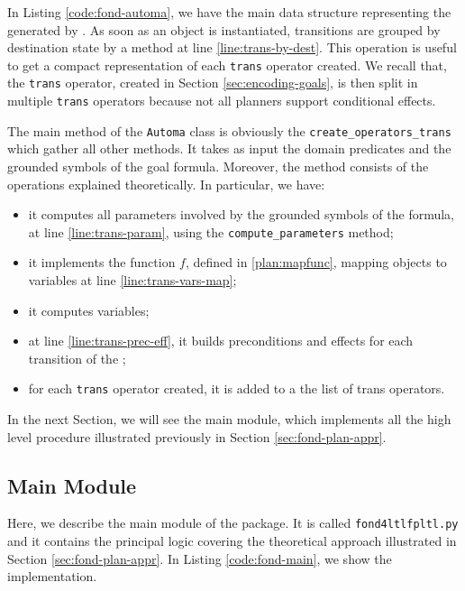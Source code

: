 In Listing \ref{code:fond-automa}, we have the main data structure representing the \DFA generated by \LTLfToDFA. As soon as an object is instantiated, transitions are grouped by destination state by a method at line \ref{line:trans-by-dest}. This operation is useful to get a compact representation of each \texttt{trans} operator created. We recall that, the \texttt{trans} operator, created in Section \ref{sec:encoding-goals}, is then split in multiple \texttt{trans} operators because not all planners support conditional effects.

The main method of the \texttt{Automa} class is obviously the \texttt{create\_operators\_trans} which gather all other methods. It takes as input the domain predicates and the grounded symbols of the goal formula. Moreover, the method consists of the operations explained theoretically. In particular, we have:
\begin{itemize}
\item it computes all parameters involved by the grounded symbols of the formula, at line \ref{line:trans-param}, using the \texttt{compute\_parameters} method;
\item it implements the function $f$, defined in \ref{plan:mapfunc}, mapping objects to variables at line \ref{line:trans-vars-map};
\item it computes variables;
\item at line \ref{line:trans-prec-eff}, it builds preconditions and effects for each transition of the \DFA;
\item for each \texttt{trans} operator created, it is added to a the list of trans operators.
\end{itemize}

In the next Section, we will see the main module, which implements all the high level procedure illustrated previously in Section \ref{sec:fond-plan-appr}.
\subsection{Main Module}
Here, we describe the main module of the \FONDFOR package. It is called \texttt{fond4ltlfpltl.py} and it contains the principal logic covering the \FONDFOR theoretical approach illustrated in Section \ref{sec:fond-plan-appr}. In Listing \ref{code:fond-main}, we show the implementation.

